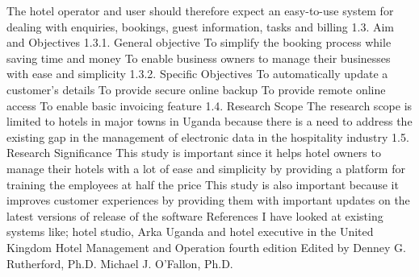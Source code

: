 \documentclass{article}
\begin{document}
{The hotel operator and user should therefore expect an easy-to-use system for dealing with enquiries, bookings, guest information, tasks and billing
1.3. Aim and Objectives
1.3.1. General objective To simplify the booking process while saving time and money
To enable business owners to manage their businesses with ease and simplicity
1.3.2. Specific Objectives To automatically update a customer’s details
To provide secure online backup
To provide remote online access
To enable basic invoicing feature
1.4. Research Scope
The research scope is limited to hotels in major towns in Uganda because there is a need to address the existing gap in the management of electronic data in the hospitality industry
1.5. Research Significance
This study is important since it helps hotel owners to manage their hotels with a lot of ease and simplicity by providing a platform for training the employees at half the price
This study is also important because it improves customer experiences by providing them with important updates on the latest versions of release of the software
References
I have looked at existing systems like; hotel studio, Arka Uganda and hotel executive in the United Kingdom
Hotel Management and Operation fourth edition
Edited by Denney G. Rutherford, Ph.D.
Michael J. O’Fallon, Ph.D.
}
\end{document}
